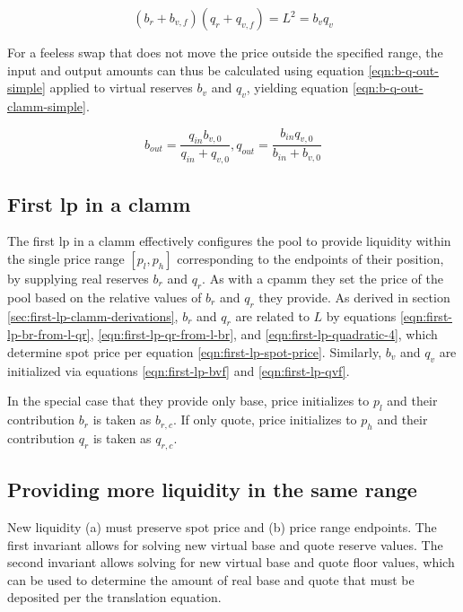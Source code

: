 \documentclass[table, twocolumn]{article}
\begin{document}
\begin{equation} \label{eqn:clamm-curve-translation}
  (b_r + b_{v, f})(q_r + q_{v, f}) = L^2 = b_v q_v
\end{equation}

For a feeless swap that does not move the price outside the specified range, the input
and output amounts can thus be calculated using equation \ref{eqn:b-q-out-simple}
applied to virtual reserves $b_v$ and $q_v$, yielding equation
\ref{eqn:b-q-out-clamm-simple}.

\begin{equation} \label{eqn:b-q-out-clamm-simple}
  b_{out} = \frac{q_{in} b_{v, 0}}{q_{in} + q_{v, 0}},
  q_{out} = \frac{b_{in} q_{v, 0}}{b_{in} + b_{v, 0}}
\end{equation}

\subsection{First \gls{lp} in a \gls{clamm}}

The first \gls{lp} in a \gls{clamm} effectively configures the pool to provide liquidity
within the single price range $[p_l, p_h]$ corresponding to the endpoints of their
position, by supplying real reserves $b_r$ and $q_r$. As with a \gls{cpamm} they set the
price of the pool based on the relative values of $b_r$ and $q_r$ they provide. As
derived in section \ref{sec:first-lp-clamm-derivations}, $b_r$ and $q_r$ are related to
$L$ by equations \ref{eqn:first-lp-br-from-l-qr}, \ref{eqn:first-lp-qr-from-l-br}, and
\ref{eqn:first-lp-quadratic-4}, which determine spot price per equation
\ref{eqn:first-lp-spot-price}. Similarly, $b_v$ and $q_v$ are initialized via equations
\ref{eqn:first-lp-bvf} and \ref{eqn:first-lp-qvf}.

In the special case that they provide only base, price initializes to $p_l$ and their
contribution $b_r$ is taken as $b_{r, c}$. If only quote, price initializes to $p_h$ and
their contribution $q_r$ is taken as $q_{r, c}$.

\subsection{Providing more liquidity in the same range}

New liquidity (a) must preserve spot price and (b) price range endpoints.
The first invariant allows for solving new virtual base and quote reserve values.
The second invariant allows solving for new virtual base and quote floor values, which
can be used to determine the amount of real base and quote that must be deposited per
the translation equation.
\end{document}
